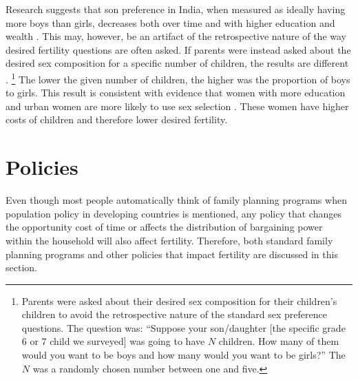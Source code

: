 \documentclass[letterpaper,12pt]{article}
\begin{document}
Research suggests that son preference in India, when measured as ideally
having more boys than girls, decreases both over time and with higher
education and wealth \citep{bhat03,pande07,Gaudin2011}. 
This may, however, be an artifact of the retrospective nature of the way
desired fertility questions are often asked. 
If parents were instead asked about the desired sex composition for a
specific number of children, the results are different
\citep{Jayachandran2017}.%
\footnote{
Parents were asked about their desired sex composition for their
children's children to avoid the retrospective nature of the standard
sex preference questions. 
The question was: ``Suppose your son/daughter [the specific grade 6 or
7 child we surveyed]
was going to have $N$ children. 
How many of them would you want to be boys and how many would you want
to be girls?'' The $N$ was a randomly chosen number between one and
five.} 
The lower the given number of children, the higher was the proportion of
boys to girls. 
This result is consistent with evidence that women with more education
and urban women are more likely to use sex selection
\citep{Portner2015b}. 
These women have higher costs of children and therefore lower desired
fertility.

\section{Policies}\label{policies}

Even though most people automatically think of family planning programs
when population policy in developing countries is mentioned, any policy
that changes the opportunity cost of time or affects the distribution of
bargaining power within the household will also affect fertility. 
Therefore, both standard family planning programs and other policies
that impact fertility are discussed in this section.
\end{document}
